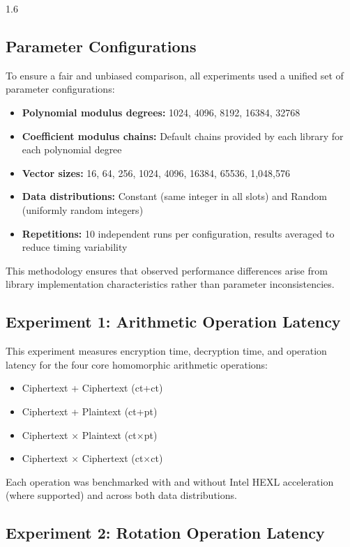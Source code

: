\begin{spacing}{1.6}
\subsection{Parameter Configurations}

To ensure a fair and unbiased comparison, all experiments used a unified set
of parameter configurations:

\begin{itemize}
  \item \textbf{Polynomial modulus degrees:} 1024, 4096, 8192, 16384, 32768
  \item \textbf{Coefficient modulus chains:} Default chains provided by each
  library for each polynomial degree
  \item \textbf{Vector sizes:} 16, 64, 256, 1024, 4096, 16384, 65536, 1,048,576
  \item \textbf{Data distributions:} Constant (same integer in all slots) and
  Random (uniformly random integers)
  \item \textbf{Repetitions:} 10 independent runs per configuration, results
  averaged to reduce timing variability
\end{itemize}

This methodology ensures that observed performance differences arise from
library implementation characteristics rather than parameter inconsistencies.

\subsection{Experiment 1: Arithmetic Operation Latency}

This experiment measures encryption time, decryption time, and operation latency
for the four core homomorphic arithmetic operations:
\begin{itemize}
  \item Ciphertext + Ciphertext (ct+ct)
  \item Ciphertext + Plaintext (ct+pt)
  \item Ciphertext $\times$ Plaintext (ct$\times$pt)
  \item Ciphertext $\times$ Ciphertext (ct$\times$ct)
\end{itemize}

Each operation was benchmarked with and without Intel HEXL acceleration (where
supported) and across both data distributions.

\subsection{Experiment 2: Rotation Operation Latency}


\end{spacing}
